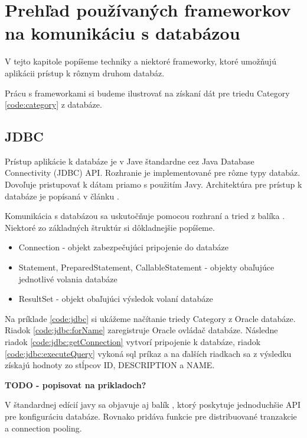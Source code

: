 
\chapter{Prehľad používaných frameworkov na komunikáciu s databázou}

V tejto kapitole popíšeme techniky a niektoré frameworky, ktoré umožňujú aplikácii prístup k rôznym druhom databáz.

Prácu s frameworkami si budeme ilustrovať na získaní dát pre triedu Category \ref{code:category} z databáze.



\section{JDBC}

Prístup aplikácie k databáze je v Jave štandardne cez Java Database Connectivity (JDBC) API.
Rozhranie je implementované pre rôzne typy databáz. Dovoľuje pristupovať k dátam priamo s použitím Javy.
Architektúra pre prístup k databáze je popísaná v článku \citet{JDBC_OVERVIEW}.

Komunikácia s databázou sa uskutočňuje pomocou rozhraní a tried z balíka \citet{java.sql}.
Niektoré zo základných štruktúr si dôkladnejšie popíšeme.

\begin{itemize}
  \item Connection - objekt zabezpečujúci pripojenie do databáze
  \item Statement, PreparedStatement, CallableStatement - objekty obaľujúce jednotlivé volania databáze
  \item ResultSet - objekt obaľujúci výsledok volaní databáze
\end{itemize}

Na príklade \ref{code:jdbc} si ukážeme načítanie triedy Category z Oracle databáze.
Riadok \ref{code:jdbc:forName} zaregistruje Oracle ovládač databáze.
Následne riadok \ref{code:jdbc:getConnection} vytvorí pripojenie k databáze,
riadok \ref{code:jdbc:executeQuery} vykoná sql príkaz a na ďalších riadkach sa z výsledku získajú
hodnoty zo stĺpcov ID, DESCRIPTION a NAME.



\textbf{TODO - popisovat na prikladoch?}

V štandardnej edícií javy sa objavuje aj balík \citet{java.sql}, ktorý poskytuje jednoduchšie API pre
konfiguráciu databáze. Rovnako pridáva funkcie pre distribuované tranzakcie a connection pooling.

